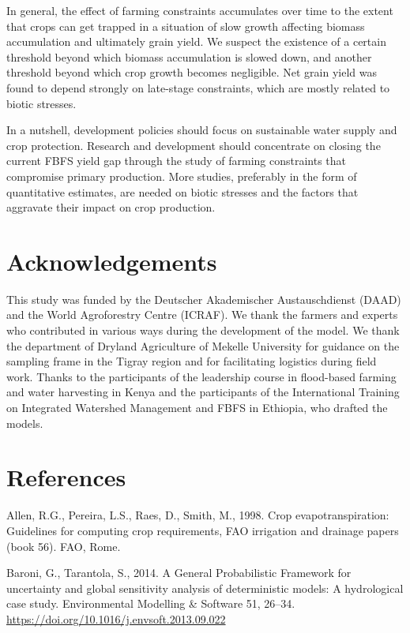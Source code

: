 \documentclass[]{elsarticle} %
\begin{document}
In general, the effect of farming constraints accumulates over time to the extent that crops can get trapped in a situation of slow growth affecting biomass accumulation and ultimately grain yield. We suspect the existence of a certain threshold beyond which biomass accumulation is slowed down, and another threshold beyond which crop growth becomes negligible. Net grain yield was found to depend strongly on late-stage constraints, which are mostly related to biotic stresses.

In a nutshell, development policies should focus on sustainable water supply and crop protection. Research and development should concentrate on closing the current FBFS yield gap through the study of farming constraints that compromise primary production. More studies, preferably in the form of quantitative estimates, are needed on biotic stresses and the factors that aggravate their impact on crop production.

\hypertarget{acknowledgements}{%
\section*{Acknowledgements}\label{acknowledgements}}

This study was funded by the Deutscher Akademischer Austauschdienst (DAAD) and the World Agroforestry Centre (ICRAF). We thank the farmers and experts who contributed in various ways during the development of the model. We thank the department of Dryland Agriculture of Mekelle University for guidance on the sampling frame in the Tigray region and for facilitating logistics during field work. Thanks to the participants of the leadership course in flood-based farming and water harvesting in Kenya and the participants of the International Training on Integrated Watershed Management and FBFS in Ethiopia, who drafted the models.

\hypertarget{references}{%
\section*{References}\label{references}}

\hypertarget{refs}{}
\leavevmode\hypertarget{ref-Allen_et_al_1998}{}%
Allen, R.G., Pereira, L.S., Raes, D., Smith, M., 1998. Crop evapotranspiration: Guidelines for computing crop requirements, FAO irrigation and drainage papers (book 56). FAO, Rome.

\leavevmode\hypertarget{ref-Baroni_and_Tarantola_2014}{}%
Baroni, G., Tarantola, S., 2014. A General Probabilistic Framework for uncertainty and global sensitivity analysis of deterministic models: A hydrological case study. Environmental Modelling \& Software 51, 26--34. \url{https://doi.org/10.1016/j.envsoft.2013.09.022}
\end{document}
